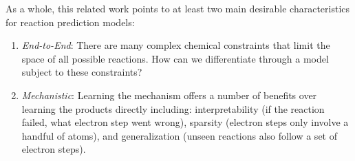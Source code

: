 As a whole, this related work points to at least two main desirable characteristics for reaction prediction models: 
\begin{enumerate}
\item \emph{End-to-End}: There are many complex chemical constraints that limit the space of all possible reactions. How can we differentiate through a model subject to these constraints?
\item \emph{Mechanistic}: Learning the mechanism offers a number of benefits over learning the products directly including: interpretability (if the reaction failed, what electron step went wrong), sparsity (electron steps only involve a handful of atoms), and generalization (unseen reactions also follow a set of electron steps).
\end{enumerate}





